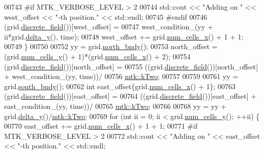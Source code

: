 \begin{DoxyCode}
00743 \textcolor{preprocessor}{      #if MTK\_VERBOSE\_LEVEL > 2}
00744       std::cout << \textcolor{stringliteral}{"Adding on "} << west\_offset << \textcolor{stringliteral}{"-th position."} << std::endl;
00745 \textcolor{preprocessor}{      #endif}
00746       (grid.\hyperlink{classmtk_1_1UniStgGrid2D_a3e72d59843a3f9c5e47da07e5850dfe0}{discrete\_field}())[west\_offset] =
00747         west\_condition\_(yy + ii*grid.\hyperlink{classmtk_1_1UniStgGrid2D_a65a78cfc80ffdbeb282ed57af4dc5cb4}{delta\_y}(), time);
00748       west\_offset += grid.\hyperlink{classmtk_1_1UniStgGrid2D_a2d182866a398aba8e4829590e85bf939}{num\_cells\_x}() + 1 + 1;
00749     \}
00750 
00752     yy = grid.\hyperlink{classmtk_1_1UniStgGrid2D_afe1ead253cdeb5503e0489eba8fd84e2}{north\_bndy}();
00753     north\_offset = (grid.\hyperlink{classmtk_1_1UniStgGrid2D_aed05a801cc9a76dba0ff203cea58a61a}{num\_cells\_y}() + 1)*(grid.\hyperlink{classmtk_1_1UniStgGrid2D_a2d182866a398aba8e4829590e85bf939}{num\_cells\_x}() + 2);
00754     (grid.\hyperlink{classmtk_1_1UniStgGrid2D_a3e72d59843a3f9c5e47da07e5850dfe0}{discrete\_field}())[north\_offset] =
00755       ((grid.\hyperlink{classmtk_1_1UniStgGrid2D_a3e72d59843a3f9c5e47da07e5850dfe0}{discrete\_field}())[north\_offset] + west\_condition\_(yy, time))/
00756         \hyperlink{group__c01-roots_gaf39c2d851a2db744f4feb1c5ab3ec2cf}{mtk::kTwo};
00757 
00759 
00761     yy = grid.\hyperlink{classmtk_1_1UniStgGrid2D_a1442eaf219f099d0ebf46a170fdebf92}{south\_bndy}();
00762     \textcolor{keywordtype}{int} east\_offset\{grid.\hyperlink{classmtk_1_1UniStgGrid2D_a2d182866a398aba8e4829590e85bf939}{num\_cells\_x}() + 1\};
00763     (grid.\hyperlink{classmtk_1_1UniStgGrid2D_a3e72d59843a3f9c5e47da07e5850dfe0}{discrete\_field}())[east\_offset] =
00764       ((grid.\hyperlink{classmtk_1_1UniStgGrid2D_a3e72d59843a3f9c5e47da07e5850dfe0}{discrete\_field}())[east\_offset] + east\_condition\_(yy, time))/
00765         \hyperlink{group__c01-roots_gaf39c2d851a2db744f4feb1c5ab3ec2cf}{mtk::kTwo};
00766 
00768     yy = yy + grid.\hyperlink{classmtk_1_1UniStgGrid2D_a65a78cfc80ffdbeb282ed57af4dc5cb4}{delta\_y}()/\hyperlink{group__c01-roots_gaf39c2d851a2db744f4feb1c5ab3ec2cf}{mtk::kTwo};
00769     \textcolor{keywordflow}{for} (\textcolor{keywordtype}{int} ii = 0; ii < grid.\hyperlink{classmtk_1_1UniStgGrid2D_aed05a801cc9a76dba0ff203cea58a61a}{num\_cells\_y}(); ++ii) \{
00770       east\_offset += grid.\hyperlink{classmtk_1_1UniStgGrid2D_a2d182866a398aba8e4829590e85bf939}{num\_cells\_x}() + 1 + 1;
00771 \textcolor{preprocessor}{      #if MTK\_VERBOSE\_LEVEL > 2}
00772       std::cout << \textcolor{stringliteral}{"Adding on "} << east\_offset << \textcolor{stringliteral}{"-th position."} << std::endl;

\end{DoxyCode}

